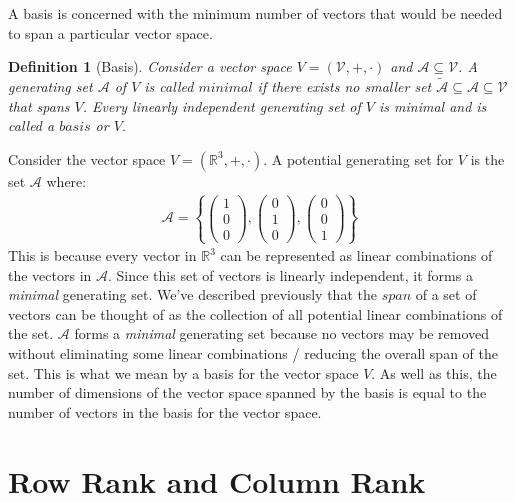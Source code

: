 \documentclass[a4paper,12pt]{book}
\newcommand{\set}[1]{\mathcal{#1}}
\newcommand{\real}{\mathbb{R}}
\newcommand{\italic}[1]{\textit{#1}}
\newtheorem{definition}{Definition}[section]
\begin{document}
	A basis is concerned with the minimum number of vectors that would be needed to span a particular vector space. 
	\begin{definition}[Basis]
		\normalfont Consider a vector space $\italic{V} = (\set{V}, +, \cdot)$ and $\set{A} \subseteq \set{V}$. A generating set $\set{A}$ of $\italic{V}$ is called $\italic{minimal}$ if there exists no smaller set $\set{\tilde{A}} \subseteq \set{A} \subseteq \set{V}$ that spans $\italic{V}$. Every linearly independent generating set of $\italic{V}$  is minimal and is called a $\italic{basis}$ or $\italic{V}$.
		\label{def:basis}
	\end{definition}
	Consider the vector space $ \italic{V} = (\real^{3}, +, \cdot) $. A potential generating set for $ \italic{V} $ is the set $ \set{A} $ where:
	\begin{align}
		\set{A} = \left\{\begin{pmatrix} 1 \\ 0 \\ 0  \end{pmatrix},\begin{pmatrix} 0 \\ 1 \\ 0 \end{pmatrix},\begin{pmatrix} 0 \\ 0 \\ 1 \end{pmatrix} \right\}
	\end{align}
	This is because every vector in $ \real^{3} $ can be represented as linear combinations of the vectors in $ \set{A} $. Since this set of vectors is linearly independent, it forms a \italic{minimal} generating set. We've described previously that the $ span $ of a set of vectors can be thought of as the collection of all potential linear combinations of the set. $ \set{A} $ forms a \italic{minimal} generating set because no vectors may be removed without eliminating some linear combinations / reducing the overall span of the set. This is what we mean by a basis for the vector space $ V $. 
	As well as this, the number of dimensions of the vector space spanned by the basis is equal to the number of vectors in the basis for the vector space.
	\section{Row Rank and Column Rank}
	
\end{document}
